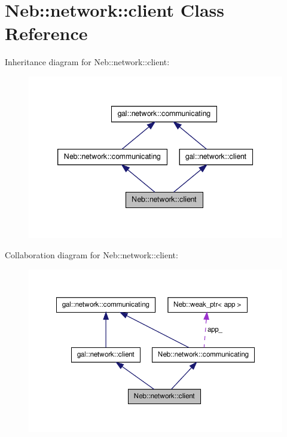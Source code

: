 \hypertarget{classNeb_1_1network_1_1client}{\section{\-Neb\-:\-:network\-:\-:client \-Class \-Reference}
\label{classNeb_1_1network_1_1client}
}


\-Inheritance diagram for \-Neb\-:\-:network\-:\-:client\-:\nopagebreak
\begin{figure}[H]
\begin{center}
\leavevmode
\includegraphics[width=342pt]{classNeb_1_1network_1_1client__inherit__graph}
\end{center}
\end{figure}


\-Collaboration diagram for \-Neb\-:\-:network\-:\-:client\-:\nopagebreak
\begin{figure}[H]
\begin{center}
\leavevmode
\includegraphics[width=350pt]{classNeb_1_1network_1_1client__coll__graph}
\end{center}
\end{figure}
